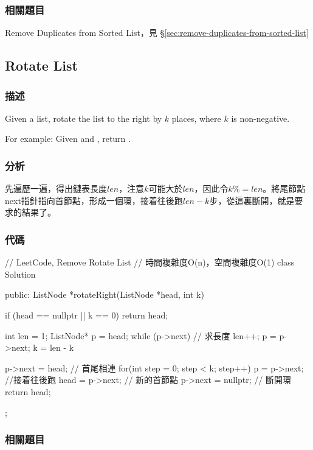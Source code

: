 \subsubsection{相關題目}

\begindot
\item Remove Duplicates from Sorted List，見 \S \ref{sec:remove-duplicates-from-sorted-list}
\myenddot


\subsection{Rotate List}
\label{sec:rotate-list}


\subsubsection{描述}
Given a list, rotate the list to the right by $k$ places, where $k$ is non-negative.

For example:
Given  and , return .


\subsubsection{分析}
先遍歷一遍，得出鏈表長度$len$，注意$k$可能大於$len$，因此令$k \%= len$。將尾節點next指針指向首節點，形成一個環，接着往後跑$len-k$步，從這裏斷開，就是要求的結果了。


\subsubsection{代碼}
\begin{Code}
// LeetCode, Remove Rotate List
// 時間複雜度O(n)，空間複雜度O(1)
class Solution {
public:
    ListNode *rotateRight(ListNode *head, int k) {
        if (head == nullptr || k == 0) return head;

        int len = 1;
        ListNode* p = head;
        while (p->next) { // 求長度
            len++;
            p = p->next;
        }
        k = len - k %

        p->next = head; // 首尾相連
        for(int step = 0; step < k; step++) {
            p = p->next;  //接着往後跑
        }
        head = p->next; // 新的首節點
        p->next = nullptr; // 斷開環
        return head;
    }
};
\end{Code}


\subsubsection{相關題目}


